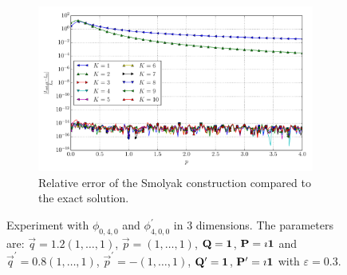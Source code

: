 \documentclass[a4paper,10pt]{article}
\begin{document}
\begin{figure}[ht!]
\begin{subfigure}[t]{0.5\linewidth}
    \includegraphics[width=\linewidth]{./plots/tp_sg_3d_conv_p_(0,4,0)_(4,0,0)_err_rel_nsd_gk.pdf}
    \caption{Relative error of the Smolyak construction compared to the exact solution.}
    \label{fig:tp_sg_3d_conv_p_040_400_err_rel_nsd_gk}
  \end{subfigure}
  \label{fig:tp_sg_3d_conv_p_040_400}
  \caption{Experiment with $\phi_{0,4,0}$ and $\phi_{4,0,0}^{\prime}$
  in 3 dimensions.
  The parameters are:
  $\vec{q} = 1.2 (1,\ldots,1)$,
  $\vec{p} = (1,\ldots,1)$,
  $\mathbf{Q} = \mathbf{1}$,
  $\mathbf{P} = \imath \mathbf{1}$
  and
  $\vec{q}^\prime = 0.8 (1,\ldots,1)$,
  $\vec{p}^\prime = -(1,\ldots,1)$,
  $\mathbf{Q}^\prime = \mathbf{1}$,
  $\mathbf{P}^\prime = \imath \mathbf{1}$
  with $\varepsilon=0.3$.}
\end{figure}
\end{document}
